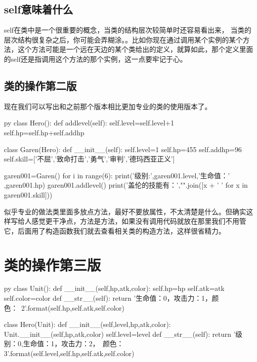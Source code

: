 \documentclass[12pt,oneside]{book}
\begin{document}
\begin{common-format}
\subsection{self意味着什么}
self在类中是一个很重要的概念，当类的结构层次较简单时还容易看出来， 当类的层次结构很复杂之后，你可能会弄糊涂。。比如你现在通过调用某个实例的某个方法，这个方法可能是一个远在天边的某个类给出的定义，就算如此，那个定义里面的self还是指调用这个方法的那个实例，这一点要牢记于心。


\subsection{类的操作第二版}
现在我们可以写出和之前那个版本相比更加专业的类的使用版本了。
\begin{xverbatim}[129]{py}
class Hero():
    def addlevel(self):
        self.level=self.level+1
        self.hp=self.hp+self.addhp

class Garen(Hero):
    def __init__(self):
        self.level=1
        self.hp=455
        self.addhp=96
        self.skill=['不屈','致命打击','勇气','审判','德玛西亚正义']

garen001=Garen()
for i in range(6):
    print('级别:',garen001.level,'生命值：' ,garen001.hp)
    garen001.addlevel()
print('盖伦的技能有：',"".join([x + '  ' for x in garen001.skill]))
\end{xverbatim}

似乎专业的做法类里面多放点方法，最好不要放属性，不太清楚是什么。但确实这样写给人感觉更干净点，方法是方法，如果没有调用代码就放在那里我们不用管它，后面用了构造函数我们就去查看相关类的构造方法，这样很省精力。


\section{类的操作第三版}
\label{sec:类的操作第三版}
\begin{xverbatim}[129]{py}
class Unit():
    def __init__(self,hp,atk,color):
        self.hp=hp
        self.atk=atk
        self.color=color
    def __str__(self):
        return '生命值：{0}，攻击力：{1}，颜色：\
        {2}'.format(self.hp,self.atk,self.color)

class Hero(Unit):
    def __init__(self,level,hp,atk,color):
        Unit.__init__(self,hp,atk,color)
        self.level=level
    def __str__(self):
        return '级别：{0},生命值：{1}，攻击力：{2}，\
        颜色：{3}'.format(self.level,self.hp,self.atk,self.color)


\end{xverbatim}
\end{common-format}
\end{document}
